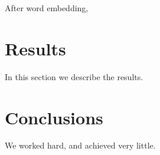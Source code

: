 \documentclass[12pt]{article}
\begin{document}
After word embedding, 

\section{Results}\label{results}
In this section we describe the results.

\section{Conclusions}\label{conclusions}
We worked hard, and achieved very little.



\end{document}
